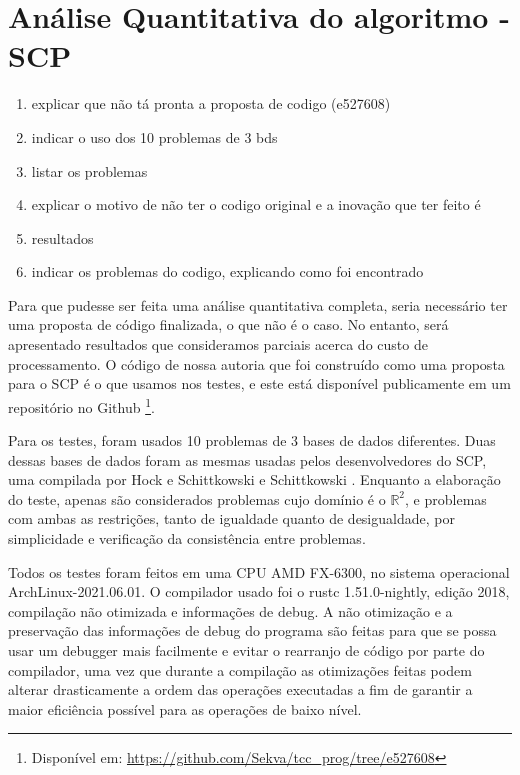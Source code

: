 \section{Análise Quantitativa do algoritmo - SCP}

\begin{enumerate}
\item explicar que não tá pronta a proposta de codigo (e527608)
\item indicar o uso dos 10 problemas de 3 bds
\item listar os problemas
\item explicar o motivo de não ter o codigo original e a inovação que ter feito é
\item resultados
\item indicar os problemas do codigo, explicando como foi encontrado
\end{enumerate}


Para que pudesse ser feita uma análise quantitativa completa, seria necessário ter uma
proposta de código finalizada, o que não é o caso. No entanto, será apresentado
resultados que consideramos parciais acerca do custo de processamento.
O código de nossa autoria que foi construído como uma proposta para o SCP é
o que usamos nos testes, e este está disponível publicamente em um repositório no Github
\footnote{Disponível em: \url{https://github.com/Sekva/tcc_prog/tree/e527608}}.

Para os testes, foram usados 10 problemas de 3 bases de dados diferentes.
Duas dessas bases de dados foram as mesmas usadas pelos desenvolvedores do
SCP, uma compilada por Hock e Schittkowski \cite{Hock1981}
e Schittkowski \cite{Schittkowski1987}. Enquanto a elaboração do teste, apenas são
considerados problemas cujo domínio é o \(\mathbb{R}^2\), e problemas com ambas as
restrições, tanto de igualdade quanto de desigualdade, por simplicidade e
verificação da consistência entre problemas.

Todos os testes foram feitos em uma CPU AMD FX-6300, no sistema operacional
ArchLinux-2021.06.01. O compilador usado foi o rustc 1.51.0-nightly, edição 2018,
compilação não otimizada e informações de debug. A não otimização e a preservação
das informações de debug do programa são feitas para que se possa usar um debugger
mais facilmente e evitar o rearranjo de código por parte do compilador, uma vez
que durante a compilação as otimizações feitas podem alterar drasticamente a
ordem das operações executadas a fim de garantir a maior eficiência possível
para as operações de baixo nível.

